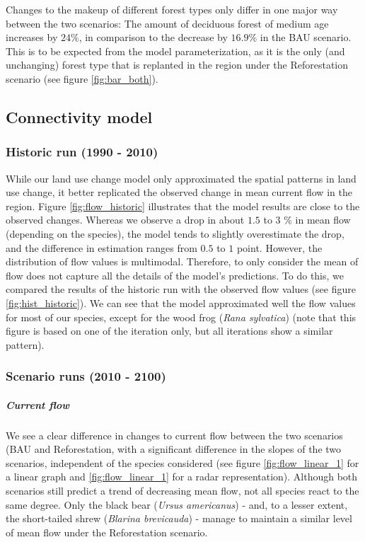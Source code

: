 Changes to the makeup of different forest types only differ in one major way between the two scenarios: The amount of deciduous forest of medium age increases by $24\%$, in comparison to the decrease by $16.9\%$ in the BAU scenario. This is to be expected from the model parameterization, as it is the only (and unchanging) forest type that is replanted in the region under the Reforestation scenario (see figure \ref{fig:bar_both}). \\

\subsection{Connectivity model}

\subsubsection*{Historic run (1990 - 2010)}

While our land use change model only approximated the spatial patterns in land use change, it better replicated the observed change in mean current flow in the region. Figure \ref{fig:flow_historic} illustrates that the model results are close to the observed changes. Whereas we observe a drop in about $1.5$ to $3$ \% in mean flow (depending on the species), the model tends to slightly overestimate the drop, and the difference in estimation ranges from $0.5$ to $1$ point. However, the distribution of flow values is multimodal. Therefore, to only consider the mean of flow does not capture all the details of the model’s predictions. To do this, we compared the results of the historic run with the observed flow values (see figure \ref{fig:hist_historic}).  We can see that the model approximated well the flow values for most of our species, except for the wood frog (\textit{Rana sylvatica}) (note that this figure is based on one of the iteration only, but all iterations show a similar pattern). \\

\subsubsection*{Scenario runs (2010 - 2100)}

\vspace{1em}

\subparagraph*{\textit{Current flow}} We see a clear difference in changes to current flow between the two scenarios (BAU and Reforestation, with a significant difference in the slopes of the two scenarios, independent of the species considered (see figure \ref{fig:flow_linear_1} for a linear graph and \ref{fig:flow_linear_1} for a radar representation). Although both scenarios still predict a trend of decreasing mean flow, not all species react to the same degree. Only the black bear (\textit{Ursus americanus}) - and, to a lesser extent, the short-tailed shrew (\textit{Blarina brevicauda}) - manage to maintain a similar level of mean flow under the Reforestation scenario.


